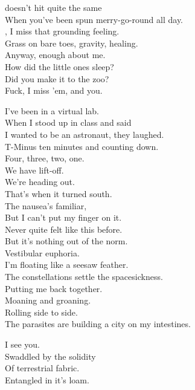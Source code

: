  doesn't hit quite the same \\
When you've been spun merry-go-round all day. \\
, I miss that grounding feeling. \\
Grass on bare toes, gravity, healing. \\
Anyway, enough about me. \\
How did the little ones sleep? \\
Did you make it to the zoo? \\
Fuck, I miss 'em, and you. \\


I've been  in a virtual lab. \\
When I stood up in class and said \\
I wanted to be an astronaut, they laughed. \\
T-Minus ten minutes and counting down. \\
Four, three, two, one. \\
We have lift-off. \\
We're heading out. \\
That's when it turned south. \\

The nausea's familiar, \\
But I can't put my finger on it. \\
Never quite felt like this before. \\
But it's nothing out of the norm. \\
Vestibular euphoria. \\
I'm floating like a seesaw feather. \\
The constellations settle the spacesickness. \\
Putting me back together. \\

Moaning and groaning. \\
Rolling side to side. \\
The parasites are building a city on my intestines. \\


I see you. \\
Swaddled by the solidity \\
Of terrestrial fabric. \\
Entangled in it's loam. \\

